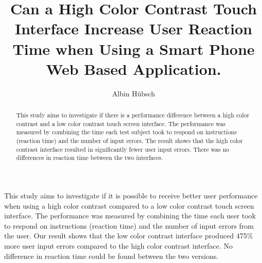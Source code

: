 \documentclass[runningheads,a4paper]{llncs}
\begin{document}
\pagestyle{headings}

\mainmatter


\title{Can a High Color Contrast Touch Interface Increase User Reaction Time when Using a Smart Phone Web Based Application.}





\author{Albin Hübsch}


\maketitle

%
\begin{abstract}
This study aims to investigate if there is a performance difference between a high color contrast and a low color contrast touch screen interface. The performance was measured by combining the time each test subject took to respond on instructions (reaction time) and the number of input errors. The result shows that the high color contrast interface resulted in significantly fewer user input errors. There was no differences in reaction time between the two interfaces. 
\end{abstract}
%
%
This study aims to investigate if it is possible to receive better user performance when using a high color contrast compared to a low color contrast touch screen interface. The performance was measured by combining the time each user took to respond on instructions (reaction time) and the number of input errors from the user. Our result shows that the low color contrast interface produced 475\% more user input errors compared to the high color contrast interface. No difference in reaction time could be found between the two versions.
\end{document}
